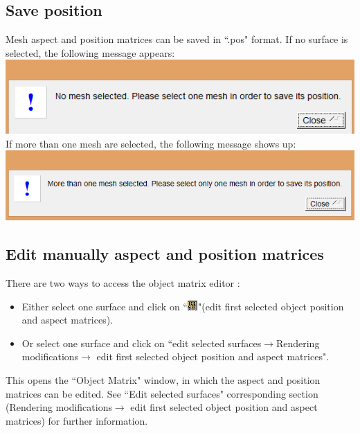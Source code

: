 \subsection{Save position}
Mesh aspect and position matrices can be saved in ``.pos" format. If no surface is selected, the
following message appears:\\
\includegraphics[scale=0.5]{images/File/save_pos1.png}
\\
If more than one mesh are selected, the following message shows up:\\
\includegraphics[scale=0.5]{images/File/save_pos2png.png}

\subsection{Edit manually aspect and position matrices}
There are two ways to access the object matrix editor :
\begin{itemize}

\item Either select one surface and click on ``\includegraphics[scale=0.7]{images/pixmap/mat.png}"(edit first selected object position and aspect matrices).
\item Or select one surface and click on ``edit selected surfaces$\rightarrow$Rendering modifications$\rightarrow$ edit first
selected object position and aspect matrices".
\end{itemize}



This opens the ``Object Matrix" window, in which the aspect and position matrices can be edited. See ``Edit selected surfaces" corresponding section (Rendering modifications$\rightarrow$ edit first selected object position and aspect matrices) for further information.



